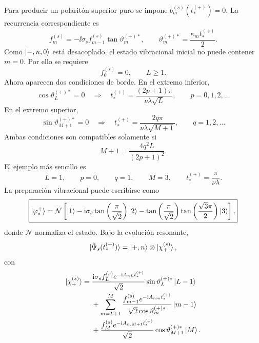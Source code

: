 Para producir un polarit\'on superior puro se impone
$b_m^{(s)}(t_*^{(+)})=0$. La recurrencia correspondiente es
\begin{equation}
  \boxed{
  f_m^{(s)}
  =
  -\ii\sigma_s f_{m-1}^{(s)}
  \tan\vartheta_m^{(+)*},
  \qquad
  \vartheta_m^{(+)*}
  =
  \frac{\kappa_m t_*^{(+)}}{2}.
  }
\end{equation}
Como $\ket{-,n,0}$ est\'a desacoplado, el estado vibracional inicial no puede
contener $m=0$. Por ello se requiere
\begin{equation}
  f_0^{(s)}=0,
  \qquad
  L\geq1.
\end{equation}
Ahora aparecen dos condiciones de borde. En el extremo inferior,
\begin{equation}
  \cos\vartheta_L^{(+)*}=0
  \quad\Longrightarrow\quad
  t_*^{(+)}
  =
  \frac{(2p+1)\pi}{\nu\lambda\sqrt L},
  \qquad p=0,1,2,\ldots
\end{equation}
En el extremo superior,
\begin{equation}
  \sin\vartheta_{M+1}^{(+)*}=0
  \quad\Longrightarrow\quad
  t_*^{(+)}
  =
  \frac{2q\pi}{\nu\lambda\sqrt{M+1}},
  \qquad q=1,2,\ldots
\end{equation}
Ambas condiciones son compatibles solamente si
\begin{equation}
  \boxed{
  M+1
  =
  \frac{4q^2L}{(2p+1)^2}.
  }
\end{equation}
El ejemplo m\'as sencillo es
\begin{equation}
  L=1,
  \qquad
  p=0,
  \qquad
  q=1,
  \qquad
  M=3,
  \qquad
  t_*^{(+)}=\frac{\pi}{\nu\lambda}.
\end{equation}
La preparaci\'on vibracional puede escribirse como
\begin{equation}
  \boxed{
  \ket{\varphi_s^{+}}
  =
  \mathcal N
  \left[
  \ket1
  -\mathrm{i}\sigma_s\tan\left(\frac{\pi}{\sqrt2}\right)\ket2
  -\tan\left(\frac{\pi}{\sqrt2}\right)
  \tan\left(\frac{\sqrt3\pi}{2}\right)\ket3
  \right],
  }
\end{equation}
donde $\mathcal N$ normaliza el estado. Bajo la evoluci\'on resonante,
\begin{equation}
  \ket{\tilde\Psi_s(t_*^{(+)})}
  =
  \ket{+,n}\otimes\ket{\chi_+^{(s)}},
\end{equation}
con
\begin{equation}
\begin{aligned}
  \ket{\chi_+^{(s)}}
  ={}&
  \frac{\mathrm{i}\sigma_s f_L^{(s)}e^{-\mathrm{i} A_{nL}t_*^{(+)}}}{\sqrt2}
  \sin\vartheta_L^{(+)*}\ket{L-1}
  \\
  &+
  \sum_{m=L+1}^{M}
  \frac{f_{m-1}^{(s)}e^{-\mathrm{i} A_{nm}t_*^{(+)}}}
  {\sqrt2\cos\vartheta_m^{(+)*}}\ket{m-1}
  \\
  &+
  \frac{f_M^{(s)}e^{-\mathrm{i} A_{n,M+1}t_*^{(+)}}}{\sqrt2}
  \cos\vartheta_{M+1}^{(+)*}\ket M.
\end{aligned}
\end{equation}

